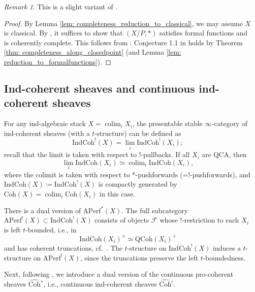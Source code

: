\documentclass{amsart}
\theoremstyle{definition}
\theoremstyle{remark}
\newtheorem{remark}[theorem]{Remark}
\numberwithin{equation}{section}
\DeclareMathOperator{\colim}{colim}
\newcommand{\mc}{\mathcal}
\newcommand{\wh}{\widehat}
\newcommand{\IndCoh}{\mathrm{IndCoh}}
\newcommand{\QCoh}{\mathrm{QCoh}}
\newcommand{\Coh}{\mathrm{Coh}}
\newcommand{\Aperf}{\mathrm{APerf}}
\begin{document}
\begin{remark}
This is a slight variant of \cite[Theorem 1.3]{AlperHallLim}. 
\end{remark}

\begin{proof}
By Lemma \ref{lem: completeness_reduction_to_classical}, we may assume $X$ is classical. By \cite[Lemma 5.6]{AlperHallLim}, it suffices to show that $(X/P, *)$ satisfies formal functions and is coherently complete. This follows from \cite[Theorem 1.3]{AlperHallLim}: Conjecture 1.1 in \cite{AlperHallLim} holds by Theorem \ref{thm: completeness_along_closedpoint} (and Lemma \ref{lem: reduction_to_formalfunctions}). 
\end{proof}

\subsection{Ind-coherent sheaves and continuous ind-coherent sheaves}
For any ind-algebraic stack $X=\colim_i X_i$, the presentable stable $\infty$-category of ind-coherent sheaves (with a $t$-structure) can be defined as
\[
\IndCoh^!(X)=\lim_i \IndCoh^!(X_i);
\]
recall that the limit is taken with respect to $!$-pullbacks. If all $X_i$ are QCA, then
\[
\lim_i \IndCoh(X_i) \simeq \colim_i \IndCoh(X_i), 
\]
where the colimit is taken with respect to $*$-pushforwards (=$!$-pushforwards), and $\IndCoh(X)\coloneq\IndCoh^!(X)$ is compactly generated by $\Coh(X)=\colim_i \Coh(X_i)$ in this case. 

There is a dual version of $\Aperf^*(X)$. The full subcategory $\Aperf^! (X)\subset \IndCoh^! (X)$ consists of objects $\mc F$ whose $!$-restriction to each $X_i$ is left $t$-bounded, i.e., in 
\[
\IndCoh(X_i)^{+} \simeq \QCoh(X_i)^{+}
\]
and has coherent truncations, cf.~\cite[Proposition 2.2.14]{chendhillon}. The $t$-structure on $\IndCoh^!(X)$ induces a $t$-structure on $\Aperf^!(X)$, since the truncations preserve the left $t$-boundedness. 

Next, following \cite{chendhillon, Chen2023categorical, BCHNconstructible}, we introduce a dual version of the continuous pro-coherent sheaves $\wh{\Coh}{}^*$, i.e., continuous ind-coherent sheaves $\wh{\Coh}{}^!$. 
\end{document}
